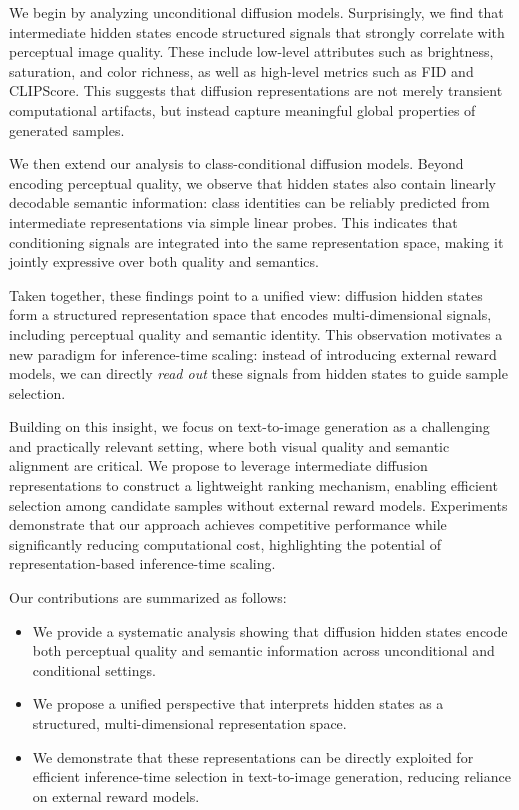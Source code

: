 \documentclass{article}
\begin{document}
We begin by analyzing unconditional diffusion models. Surprisingly, we find that intermediate hidden states encode structured signals that strongly correlate with perceptual image quality. These include low-level attributes such as brightness, saturation, and color richness, as well as high-level metrics such as FID and CLIPScore. This suggests that diffusion representations are not merely transient computational artifacts, but instead capture meaningful global properties of generated samples.

We then extend our analysis to class-conditional diffusion models. Beyond encoding perceptual quality, we observe that hidden states also contain linearly decodable semantic information: class identities can be reliably predicted from intermediate representations via simple linear probes. This indicates that conditioning signals are integrated into the same representation space, making it jointly expressive over both quality and semantics.

Taken together, these findings point to a unified view: diffusion hidden states form a structured representation space that encodes multi-dimensional signals, including perceptual quality and semantic identity. This observation motivates a new paradigm for inference-time scaling: instead of introducing external reward models, we can directly \emph{read out} these signals from hidden states to guide sample selection.

Building on this insight, we focus on text-to-image generation as a challenging and practically relevant setting, where both visual quality and semantic alignment are critical. We propose to leverage intermediate diffusion representations to construct a lightweight ranking mechanism, enabling efficient selection among candidate samples without external reward models. Experiments demonstrate that our approach achieves competitive performance while significantly reducing computational cost, highlighting the potential of representation-based inference-time scaling.

Our contributions are summarized as follows:

\begin{itemize}
    \item We provide a systematic analysis showing that diffusion hidden states encode both perceptual quality and semantic information across unconditional and conditional settings.
    \item We propose a unified perspective that interprets hidden states as a structured, multi-dimensional representation space.
    \item We demonstrate that these representations can be directly exploited for efficient inference-time selection in text-to-image generation, reducing reliance on external reward models.
\end{itemize}
\end{document}
